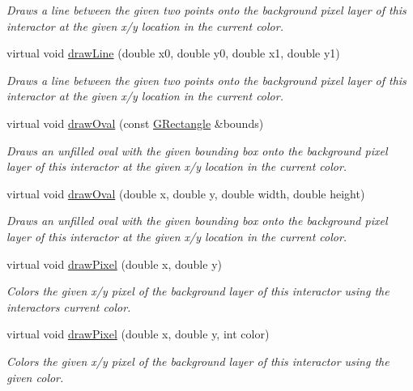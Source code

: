 \begin{DoxyCompactItemize}
\begin{DoxyCompactList}\small\item\em Draws a line between the given two points onto the background pixel layer of this interactor at the given x/y location in the current color. \end{DoxyCompactList}\item 
virtual void \mbox{\hyperlink{classGDrawingSurface_aff299fe83178d2f3ce8c08c06b583484}{draw\+Line}} (double x0, double y0, double x1, double y1)
\begin{DoxyCompactList}\small\item\em Draws a line between the given two points onto the background pixel layer of this interactor at the given x/y location in the current color. \end{DoxyCompactList}\item 
virtual void \mbox{\hyperlink{classGDrawingSurface_a8adc13027efe311b4a6a715205b8bc46}{draw\+Oval}} (const \mbox{\hyperlink{structGRectangle}{G\+Rectangle}} \&bounds)
\begin{DoxyCompactList}\small\item\em Draws an unfilled oval with the given bounding box onto the background pixel layer of this interactor at the given x/y location in the current color. \end{DoxyCompactList}\item 
virtual void \mbox{\hyperlink{classGDrawingSurface_aa5b1cf902e578907da3c63060686354e}{draw\+Oval}} (double x, double y, double width, double height)
\begin{DoxyCompactList}\small\item\em Draws an unfilled oval with the given bounding box onto the background pixel layer of this interactor at the given x/y location in the current color. \end{DoxyCompactList}\item 
virtual void \mbox{\hyperlink{classGDrawingSurface_a0c1e2923d8d163d62d0896d8c5cfa191}{draw\+Pixel}} (double x, double y)
\begin{DoxyCompactList}\small\item\em Colors the given x/y pixel of the background layer of this interactor using the interactor\textquotesingle{}s current color. \end{DoxyCompactList}\item 
virtual void \mbox{\hyperlink{classGDrawingSurface_a3a64eb6383e601be8438e9c71643c432}{draw\+Pixel}} (double x, double y, int color)
\begin{DoxyCompactList}\small\item\em Colors the given x/y pixel of the background layer of this interactor using the given color. \end{DoxyCompactList}\item 

\end{DoxyCompactItemize}
